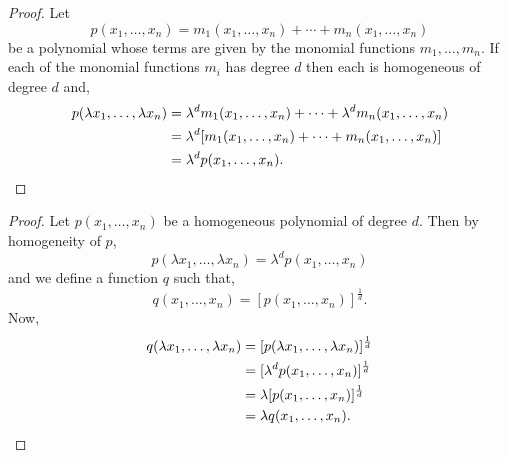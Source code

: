 \documentclass[../MathsNotesBase.tex]{subfiles}
\begin{document}
{		\bigskip
		\begin{tcolorbox}[breakable,enhanced jigsaw,colframe=white,colback=white,boxrule=0pt,arc=0pt,left=0pt,right=0pt,top=0pt,bottom=0pt]
			\begin{proof}
				Let 
				\[ p(x_1,\dots,x_n) = m_1(x_1,\dots,x_n) + \cdots + m_n(x_1,\dots,x_n) \]
				be a polynomial whose terms are given by the monomial functions ${ m_1,\dots,m_n }$. If each of the monomial functions $m_i$ has degree $d$ then each is homogeneous of degree $d$ and,
				\[\begin{aligned}
					p(\lambda x_1, \dots, \lambda x_n) &= \lambda^d m_1(x_1,\dots,x_n) + \cdots + \lambda^d  m_n(x_1,\dots,x_n) \\
					&= \lambda^d [ m_1(x_1,\dots,x_n) + \cdots + m_n(x_1,\dots,x_n) ] \\
					&= \lambda^d p(x_1,\dots,x_n). \qedhere
				\end{aligned}\]
			\end{proof}
		\end{tcolorbox}
	
		\bigskip
		\begin{tcolorbox}[breakable,enhanced jigsaw,colframe=white,colback=white,boxrule=0pt,arc=0pt,left=0pt,right=0pt,top=0pt,bottom=0pt]
			\begin{proof}
				Let ${ p(x_1,\dots,x_n) }$ be a homogeneous polynomial of degree $d$. Then by homogeneity of $p$,
				\[ p(\lambda x_1, \dots, \lambda x_n) = \lambda^d p(x_1,\dots,x_n) \]
				and we define a function $q$ such that,
				\[ q(x_1,\dots,x_n) = [p(x_1,\dots,x_n)]^{\frac{1}{d}}. \]
				Now,
				\[\begin{aligned}
					q(\lambda x_1, \dots, \lambda x_n) &= [p(\lambda x_1, \dots, \lambda x_n)]^{\frac{1}{d}} \\
					&= [\lambda^d p(x_1,\dots,x_n)]^{\frac{1}{d}} \\
					&= \lambda [p(x_1,\dots,x_n)]^{\frac{1}{d}} \\
					&= \lambda q(x_1,\dots,x_n). \qedhere \\
				\end{aligned}\]
			\end{proof}
		\end{tcolorbox}
	
}
\end{document}
